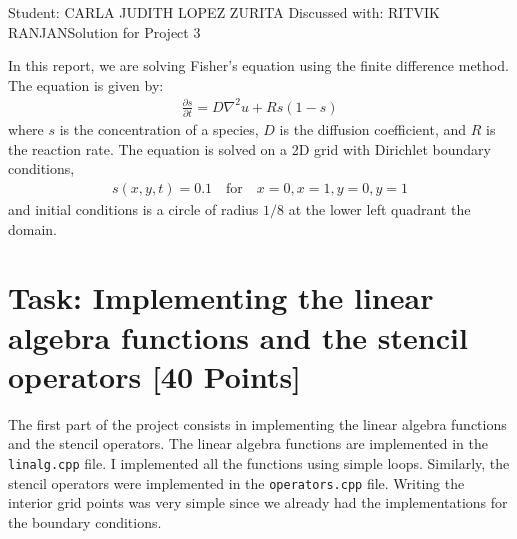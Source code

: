 \documentclass[unicode,11pt,a4paper,oneside,numbers=endperiod,openany]{scrartcl}
\begin{document}
\setassignment
{}

            {Student: CARLA JUDITH LOPEZ ZURITA}
            {Discussed with: RITVIK RANJAN}{Solution for Project 3}{}
\newline

\assignmentpolicy

In this report, we are solving Fisher's equation using the finite difference
method. The equation is given by:
\begin{align}
    \frac{\partial s}{\partial t} = D \nabla^2 u + R s (1 - s)
\end{align}
where $s$ is the concentration of a species, $D$ is the diffusion coefficient,
and $R$ is the reaction rate. The equation is solved on a 2D grid with
Dirichlet boundary conditions,
\begin{align}
    s(x, y, t) = 0.1 \quad \text{for} \quad x = 0, x = 1, y = 0, y = 1
\end{align}
and initial conditions is a circle of radius $1/8$ at the lower left quadrant the domain.
\section{Task: Implementing the linear algebra functions and the stencil
         operators [40 Points]}

The first part of the project consists in implementing the linear algebra functions and
the stencil operators. The linear algebra functions are implemented in the
\texttt{linalg.cpp} file. I implemented all the functions using
simple loops.
Similarly, the stencil operators were implemented in the
\texttt{operators.cpp} file. Writing the interior grid points was very simple since
we already had the implementations for the boundary conditions.
\end{document}
